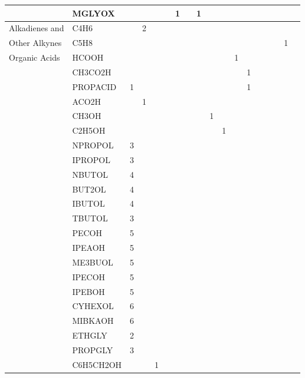 \begin{longtable}{llllllllllllllllll}
	 & MGLYOX &  &  &  &  & 1 &  & 1 &  &  &  &  &  &  &  &  & \\
	\hline Alkadienes and & C4H6 &  & 2 &  &  &  &  &  &  &  &  &  &  &  &  &  & \\
	Other Alkynes & C5H8 &  &  &  &  &  &  &  &  &  &  &  &  &  &  & 1 & \\
	\hline \multirow{4}{*}{Organic Acids} & HCOOH &  &  &  &  &  &  &  &  &  & 1 &  &  &  &  &  & \\
	 & CH3CO2H &  &  &  &  &  &  &  &  &  &  & 1 &  &  &  &  & \\
	 & PROPACID & 1 &  &  &  &  &  &  &  &  &  & 1 &  &  &  &  & \\
	 & ACO2H &  & 1 &  &  &  &  &  &  &  &  &  &  &  &  &  & \\
	\hline \parbox[t]{2mm}{} & CH3OH &  &  &  &  &  &  &  & 1 &  &  &  &  &  &  &  & \\
	 & C2H5OH &  &  &  &  &  &  &  &  & 1 &  &  &  &  &  &  & \\
	 & NPROPOL & 3 &  &  &  &  &  &  &  &  &  &  &  &  &  &  & \\
	 & IPROPOL & 3 &  &  &  &  &  &  &  &  &  &  &  &  &  &  & \\
	 & NBUTOL & 4 &  &  &  &  &  &  &  &  &  &  &  &  &  &  & \\
	 & BUT2OL & 4 &  &  &  &  &  &  &  &  &  &  &  &  &  &  & \\
	 & IBUTOL & 4 &  &  &  &  &  &  &  &  &  &  &  &  &  &  & \\
	 & TBUTOL & 3 &  &  &  &  &  &  &  &  &  &  &  &  &  &  & \\
	 & PECOH & 5 &  &  &  &  &  &  &  &  &  &  &  &  &  &  & \\
	 & IPEAOH & 5 &  &  &  &  &  &  &  &  &  &  &  &  &  &  & \\
	 & ME3BUOL & 5 &  &  &  &  &  &  &  &  &  &  &  &  &  &  & \\
	 & IPECOH & 5 &  &  &  &  &  &  &  &  &  &  &  &  &  &  & \\
	 & IPEBOH & 5 &  &  &  &  &  &  &  &  &  &  &  &  &  &  & \\
	 & CYHEXOL & 6 &  &  &  &  &  &  &  &  &  &  &  &  &  &  & \\
	 & MIBKAOH & 6 &  &  &  &  &  &  &  &  &  &  &  &  &  &  & \\
	 & ETHGLY & 2 &  &  &  &  &  &  &  &  &  &  &  &  &  &  & \\
	 & PROPGLY & 3 &  &  &  &  &  &  &  &  &  &  &  &  &  &  & \\
	 & C6H5CH2OH &  &  & 1 &  &  &  &  &  &  &  &  &  &  &  &  & \\

\end{longtable}
